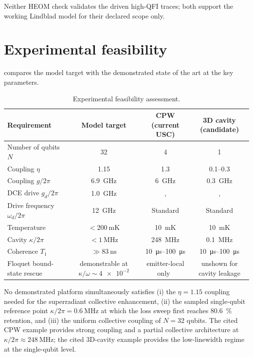 \documentclass[aps,prxquantum,preprint,superscriptaddress,amsmath,amssymb]{revtex4-2}
\begin{document}
Neither HEOM check validates the driven high-QFI traces; both support the working Lindblad model for their declared scope only.

\section{Experimental feasibility}
\label{sec:si_feasibility_B}

 compares the model target with the demonstrated state of the art at the key parameters.

\begin{table}[hbt!]
\centering
\caption{Experimental feasibility assessment.}
\label{tab:si_experimental_feasibility}
\begin{tabular}{l c c c}
\toprule
\textbf{Requirement} & \textbf{Model target} & \textbf{CPW (current USC)} & \textbf{3D cavity (candidate)} \\
\midrule
Number of qubits $N$ & \num{32} & \num{4} \cite{Yoshihara2017} & \num{1} \cite{FornDiaz2017} \\
Coupling $\eta$ & \num{1.15} & \num{1.3} \cite{Niemczyk2010} & \numrange{0.1}{0.3} \cite{FornDiaz2017} \\
Coupling $g/2\pi$ & \qty{6.9}{\giga\hertz} & \qty{6}{\giga\hertz} \cite{Niemczyk2010} & \qty{0.3}{\giga\hertz} \cite{FornDiaz2017} \\
DCE drive $g_d/2\pi$ & \qty{1.0}{\giga\hertz} &, &, \\
Drive frequency $\omega_d/2\pi$ & \qty{12}{\giga\hertz} & Standard & Standard \\
Temperature & $<\qty{200}{\milli\kelvin}$ & \qty{10}{\milli\kelvin} & \qty{10}{\milli\kelvin} \\
Cavity $\kappa/2\pi$ & $<\qty{1}{\mega\hertz}$ & \qty{248}{\mega\hertz} & \qty{0.1}{\mega\hertz} \\
Coherence $T_1$ & $\gg\qty{83}{\nano\second}$ & \qtyrange{10}{100}{\micro\second} & \qtyrange{10}{100}{\micro\second} \\
Floquet bound-state rescue & demonstrable at $\kappa/\omega\sim\num{4e-2}$ & emitter-local only~\cite{Bai2023} & unshown for cavity leakage \\
\bottomrule
\end{tabular}
\end{table}

No demonstrated platform simultaneously satisfies (i) the $\eta=\num{1.15}$ coupling needed for the superradiant collective enhancement, (ii) the sampled single-qubit reference point $\kappa/2\pi=\qty{0.6}{\mega\hertz}$ at which the loss sweep first reaches \qty{80.6}{\percent} retention, and (iii) the uniform collective coupling of $N=\num{32}$ qubits. The cited CPW example provides strong coupling and a partial collective architecture at $\kappa/2\pi\approx\qty{248}{\mega\hertz}$; the cited 3D-cavity example provides the low-linewidth regime at the single-qubit level.
\end{document}
